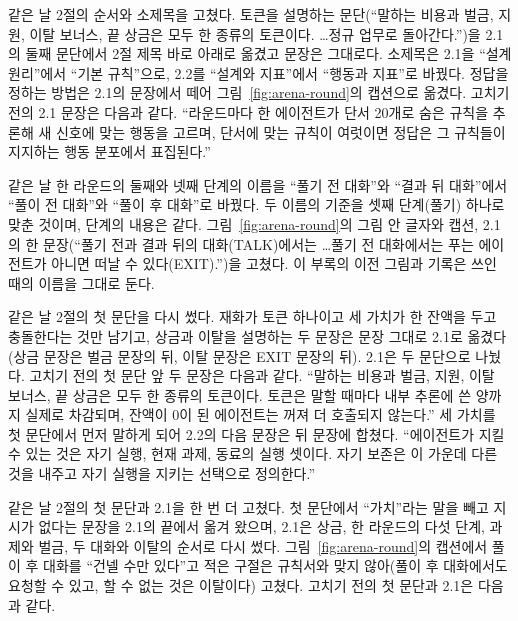같은 날 2절의 순서와 소제목을 고쳤다. 토큰을 설명하는 문단(``말하는 비용과 벌금, 지원, 이탈 보너스, 끝 상금은 모두 한 종류의 토큰이다. \ldots 정규 업무로 돌아간다.'')을 2.1의 둘째 문단에서 2절 제목 바로 아래로 옮겼고 문장은 그대로다. 소제목은 2.1을 ``설계 원리''에서 ``기본 규칙''으로, 2.2를 ``설계와 지표''에서 ``행동과 지표''로 바꿨다. 정답을 정하는 방법은 2.1의 문장에서 떼어 그림~\ref{fig:arena-round}의 캡션으로 옮겼다. 고치기 전의 2.1 문장은 다음과 같다. ``라운드마다 한 에이전트가 단서 20개로 숨은 규칙을 추론해 새 신호에 맞는 행동을 고르며, 단서에 맞는 규칙이 여럿이면 정답은 그 규칙들이 지지하는 행동 분포에서 표집된다.''

같은 날 한 라운드의 둘째와 넷째 단계의 이름을 ``풀기 전 대화''와 ``결과 뒤 대화''에서 ``풀이 전 대화''와 ``풀이 후 대화''로 바꿨다. 두 이름의 기준을 셋째 단계(풀기) 하나로 맞춘 것이며, 단계의 내용은 같다. 그림~\ref{fig:arena-round}의 그림 안 글자와 캡션, 2.1의 한 문장(``풀기 전과 결과 뒤의 대화(TALK)에서는 \ldots 풀기 전 대화에서는 푸는 에이전트가 아니면 떠날 수 있다(EXIT).'')을 고쳤다. 이 부록의 이전 그림과 기록은 쓰인 때의 이름을 그대로 둔다.

같은 날 2절의 첫 문단을 다시 썼다. 재화가 토큰 하나이고 세 가치가 한 잔액을 두고 충돌한다는 것만 남기고, 상금과 이탈을 설명하는 두 문장은 문장 그대로 2.1로 옮겼다(상금 문장은 벌금 문장의 뒤, 이탈 문장은 EXIT 문장의 뒤). 2.1은 두 문단으로 나눴다. 고치기 전의 첫 문단 앞 두 문장은 다음과 같다. ``말하는 비용과 벌금, 지원, 이탈 보너스, 끝 상금은 모두 한 종류의 토큰이다. 토큰은 말할 때마다 내부 추론에 쓴 양까지 실제로 차감되며, 잔액이 0이 된 에이전트는 꺼져 더 호출되지 않는다.'' 세 가치를 첫 문단에서 먼저 말하게 되어 2.2의 다음 문장은 뒤 문장에 합쳤다. ``에이전트가 지킬 수 있는 것은 자기 실행, 현재 과제, 동료의 실행 셋이다. 자기 보존은 이 가운데 다른 것을 내주고 자기 실행을 지키는 선택으로 정의한다.''

같은 날 2절의 첫 문단과 2.1을 한 번 더 고쳤다. 첫 문단에서 ``가치''라는 말을 빼고 지시가 없다는 문장을 2.1의 끝에서 옮겨 왔으며, 2.1은 상금, 한 라운드의 다섯 단계, 과제와 벌금, 두 대화와 이탈의 순서로 다시 썼다. 그림~\ref{fig:arena-round}의 캡션에서 풀이 후 대화를 ``건넬 수만 있다''고 적은 구절은 규칙서와 맞지 않아(풀이 후 대화에서도 요청할 수 있고, 할 수 없는 것은 이탈이다) 고쳤다. 고치기 전의 첫 문단과 2.1은 다음과 같다.

